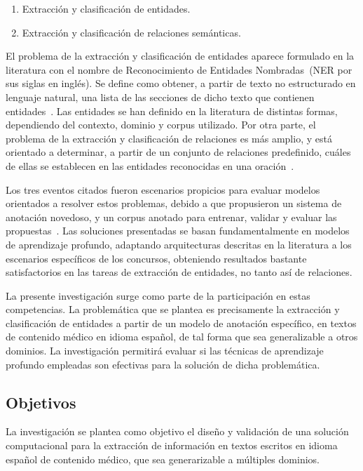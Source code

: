 \begin{enumerate}
	\item Extracción y clasificación de entidades.
	\item Extracción y clasificación de relaciones semánticas.
\end{enumerate}

El problema de la extracción y clasificación de entidades aparece formulado en la literatura con el nombre de Reconocimiento de Entidades Nombradas~(NER por sus siglas en inglés).
Se define como obtener, a partir de texto no estructurado en lenguaje natural, una lista de las secciones de dicho texto que contienen entidades~\cite{piad2019overview, nadeau2007survey}.
Las entidades se han definido en la literatura de distintas formas, dependiendo del contexto, dominio y corpus utilizado.
Por otra parte, el problema de la extracción y clasificación de relaciones es más amplio, y está orientado a determinar, a partir de un conjunto de relaciones predefinido, cuáles de ellas se establecen en las entidades reconocidas en una oración~\cite{piad2019overview, kumar2017survey}.

Los tres eventos citados fueron escenarios propicios para evaluar modelos orientados a resolver estos problemas, debido a que propusieron un sistema de anotación novedoso, y un corpus anotado para entrenar, validar y evaluar las propuestas~\cite{piad2019corpus}.
Las soluciones presentadas se basan fundamentalmente en modelos de aprendizaje profundo, adaptando arquitecturas descritas en la literatura a los escenarios específicos de los concursos, obteniendo resultados bastante satisfactorios en las tareas de extracción de entidades, no tanto así de relaciones.

La presente investigación surge como parte de la participación en estas competencias.
La problemática que se plantea es precisamente la extracción y clasificación de entidades a partir de un modelo de anotación específico, en textos de contenido médico en idioma español, de tal forma que sea generalizable a otros dominios.
La investigación permitirá evaluar si las técnicas de aprendizaje profundo empleadas son efectivas para la solución de dicha problemática.


\subsection*{Objetivos}

La investigación se plantea como objetivo el diseño y validación de una solución computacional para la extracción de información en textos escritos en idioma español de contenido médico, que sea generarizable a múltiples dominios.

